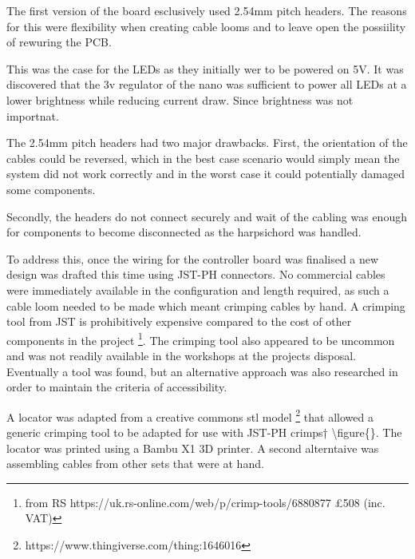 The first version of the board esclusively used 2.54mm pitch headers.
The reasons for this were flexibility when creating cable looms and to
leave open the possiility of rewuring the PCB.

This was the case for the LEDs as they initially wer to be powered on
5V. It was discovered that the 3v regulator of the nano was sufficient
to power all LEDs at a lower brightness while reducing current draw.
Since brightness was not importnat.

The 2.54mm pitch headers had two major drawbacks. First, the orientation
of the cables could be reversed, which in the best case scenario would
simply mean the system did not work correctly and in the worst case it
could potentially damaged some components.

Secondly, the headers do not connect securely and wait of the cabling
was enough for components to become disconnected as the harpsichord was
handled.

To address this, once the wiring for the controller board was finalised
a new design was drafted this time using JST-PH connectors. No
commercial cables were immediately available in the configuration and
length required, as such a cable loom needed to be made which meant
crimping cables by hand. A crimping tool from JST is prohibitively
expensive compared to the cost of other components in the project
\footnote{from RS https://uk.rs-online.com/web/p/crimp-tools/6880877
£508 (inc. VAT)}. The crimping tool also appeared to be uncommon and was
not readily available in the workshops at the projects disposal.
Eventually a tool was found, but an alternative approach was also
researched in order to maintain the criteria of accessibility.

A locator was adapted from a creative commons stl model
\footnote{https://www.thingiverse.com/thing:1646016} that allowed a
generic crimping tool to be adapted for use with JST-PH crimps†
\textbackslash figure\{\}. The locator was printed using a Bambu X1 3D
printer. A second alterntaive was assembling cables from other sets that
were at hand.

